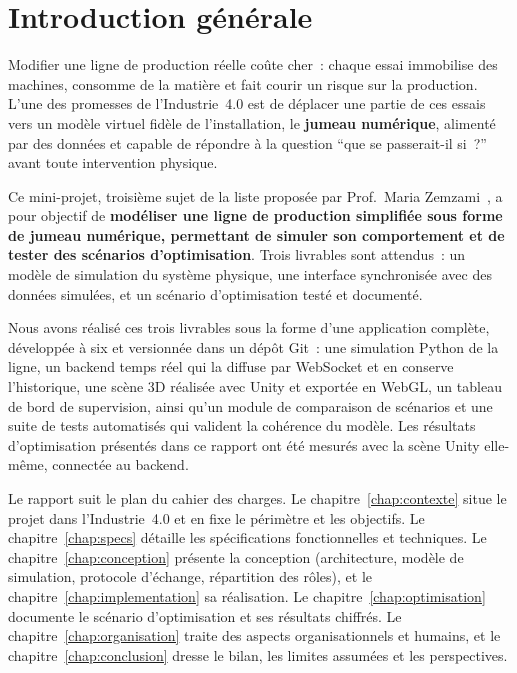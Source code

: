 \chapter*{Introduction générale}

Modifier une ligne de production réelle coûte cher~: chaque essai immobilise des machines, consomme de la matière et fait courir un risque sur la production. L'une des promesses de l'Industrie~4.0 est de déplacer une partie de ces essais vers un modèle virtuel fidèle de l'installation, le \textbf{jumeau numérique}, alimenté par des données et capable de répondre à la question \enquote{que se passerait-il si~?} avant toute intervention physique.

Ce mini-projet, troisième sujet de la liste proposée par Prof.~Maria Zemzami~\cite{zemzami2026}, a pour objectif de \textbf{modéliser une ligne de production simplifiée sous forme de jumeau numérique, permettant de simuler son comportement et de tester des scénarios d'optimisation}. Trois livrables sont attendus~: un modèle de simulation du système physique, une interface synchronisée avec des données simulées, et un scénario d'optimisation testé et documenté.

Nous avons réalisé ces trois livrables sous la forme d'une application complète, développée à six et versionnée dans un dépôt Git~: une simulation Python de la ligne, un backend temps réel qui la diffuse par WebSocket et en conserve l'historique, une scène \ac{3D} réalisée avec Unity et exportée en WebGL, un tableau de bord de supervision, ainsi qu'un module de comparaison de scénarios et une suite de tests automatisés qui valident la cohérence du modèle. Les résultats d'optimisation présentés dans ce rapport ont été mesurés avec la scène Unity elle-même, connectée au backend.

Le rapport suit le plan du cahier des charges. Le chapitre~\ref{chap:contexte} situe le projet dans l'Industrie~4.0 et en fixe le périmètre et les objectifs. Le chapitre~\ref{chap:specs} détaille les spécifications fonctionnelles et techniques. Le chapitre~\ref{chap:conception} présente la conception (architecture, modèle de simulation, protocole d'échange, répartition des rôles), et le chapitre~\ref{chap:implementation} sa réalisation. Le chapitre~\ref{chap:optimisation} documente le scénario d'optimisation et ses résultats chiffrés. Le chapitre~\ref{chap:organisation} traite des aspects organisationnels et humains, et le chapitre~\ref{chap:conclusion} dresse le bilan, les limites assumées et les perspectives.
